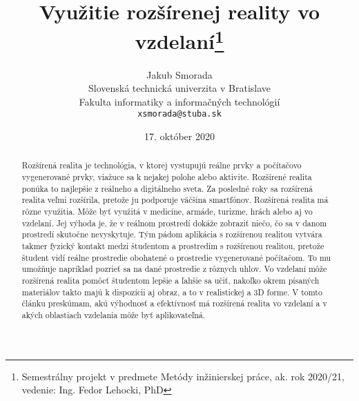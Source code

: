 \documentclass[10pt,oneside,slovak,a4paper]{article}
\title{Využitie rozšírenej reality vo vzdelaní\thanks{Semestrálny projekt v predmete Metódy inžinierskej práce, ak. rok 2020/21, vedenie: Ing. Fedor Lehocki, PhD}}
\author{Jakub Smorada\\[2pt]
	{\small Slovenská technická univerzita v Bratislave}\\
	{\small Fakulta informatiky a informačných technológií}\\
	{\small \texttt{xsmorada@stuba.sk}}
	}
\date{\small 17. október 2020}
\begin{document}
\maketitle

\begin{abstract}
Rozšírená realita je technológia, v ktorej vystupujú reálne prvky a počítačovo vygenerované prvky, viažuce sa k nejakej polohe alebo aktivite.
Rozšírené realita ponúka to najlepšie z reálneho a digitálneho sveta. 
Za posledné roky sa rozšírená realita veľmi rozšírila, pretože ju podporuje väčšina smartfónov. 
Rozšírená realita má rôzne využitia. 
Môže byť využitá v medicíne, armáde, turizme, hrách alebo aj vo vzdelaní. 
Jej výhoda je, že v reálnom prostredí dokáže zobraziť niečo, čo sa v danom prostredí skutočne nevyskytuje. 
Tým pádom aplikácia s rozšírenou realitou vytvára takmer fyzický kontakt medzi študentom a prostredím s rozšírenou realitou, pretože študent vidí reálne prostredie obohatené o prostredie vygenerované počítačom. 
To mu umožňuje napríklad pozrieť sa na dané prostredie z rôznych uhlov. 
Vo vzdelaní môže rozšírená realita pomôcť študentom lepšie a ľahšie sa učiť, nakoľko okrem písaných materiálov takto majú k dispozícii aj obraz, a to v realistickej a 3D forme. 
V tomto článku preskúmam, akú výhodnosť a efektívnosť má rozšírená realita vo vzdelaní a v akých oblastiach vzdelania môže byť aplikovateľná.
\end{abstract}
\end{document}

